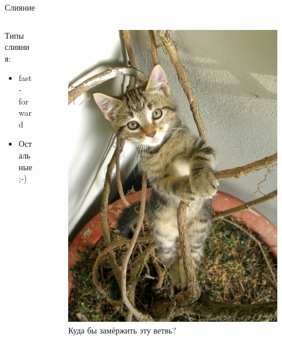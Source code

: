 \documentclass[presentation]{beamer}
\begin{document}
\begin{frame}{Слияние}
\begin{columns}
\begin{column}{.5\textwidth}
      Типы слияния:
      \begin{itemize}
      \item fast-forward
      \item Остальные  ;-)
      \end{itemize}
    \end{column}
      \begin{column}{.5\textwidth}
        \begin{figure}[htb]
          \centering
          \includegraphics[height=.8\textheight]{Fazen_-_charming_(by)}
          \newline
          Куда бы замёржить эту ветвь?
        \end{figure}
      \end{column}
    \end{columns}
\end{frame}
\end{document}
